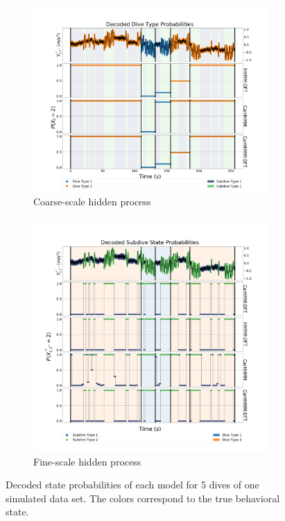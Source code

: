 \begin{figure}[ht]
    \centering
    \begin{subfigure}[t]{1.0\textwidth}
        \centering
        \includegraphics[width=3.5in]{../Plots/Posterior_Coarse_States.png}
        \caption{Coarse-scale hidden process}
    \end{subfigure}
    \begin{subfigure}[t]{1.0\textwidth}
        \centering
        \includegraphics[width=3.5in]{../Plots/Posterior_Fine_States.png}
        \caption{Fine-scale hidden process}
    \end{subfigure}
	\caption{Decoded state probabilities of each model for 5 dives of one simulated data set. The colors correspond to the true behavioral state.}
	\label{fig:acc}
\end{figure}


